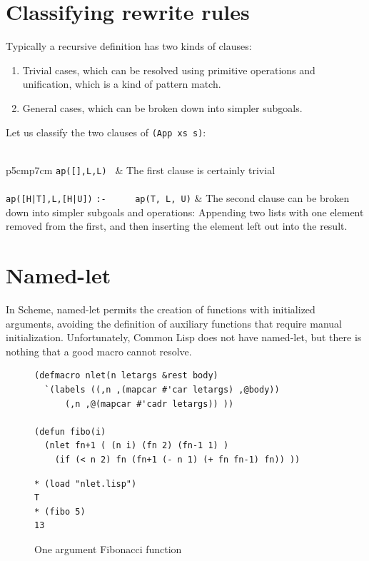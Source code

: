 \documentclass[a4paper,12pt]{book}
\newenvironment{fmpage}[1]
           {\begin{lrbox}{\fmbox}\begin{minipage}{#1}}
           {\end{minipage}\end{lrbox}\fbox{\usebox{\fmbox}}}
\begin{document}
\section{Classifying rewrite rules}
Typically a recursive definition has two kinds of clauses:
\begin{enumerate}
\item Trivial cases, which can be  
resolved using primitive operations and unification, which is
a kind of pattern match.
\item General cases, which can be  
broken down into simpler subgoals.
\end{enumerate}
Let us classify the two clauses of \verb|(App xs s)|:\\

\verb||\\
\begin{tabular}{p{5cm}p{7cm}}
\verb|ap([],L,L) | & The first clause is certainly trivial\\
\\
\verb/ap([H|T],L,[H|U])/ \verb/:- /
\verb/    ap(T, L, U)/
& The second clause can be
broken down into simpler
subgoals and operations: Appending two
lists with one element
removed from the first,
and then inserting the element
left out into the result.\\
\end{tabular}


\section{Named-let}

In Scheme, named-let
permits the creation of functions with initialized arguments,
avoiding the definition of auxiliary functions that require
manual initialization. Unfortunately, Common Lisp does not
have named-let, but there is nothing that a good macro
cannot resolve.

\begin{figure}[!h]
\begin{fmpage}{0.9\linewidth}
\begin{verbatim}
(defmacro nlet(n letargs &rest body)
  `(labels ((,n ,(mapcar #'car letargs) ,@body))
      (,n ,@(mapcar #'cadr letargs)) ))

(defun fibo(i)
  (nlet fn+1 ( (n i) (fn 2) (fn-1 1) )
    (if (< n 2) fn (fn+1 (- n 1) (+ fn fn-1) fn)) ))
\end{verbatim}
\end{fmpage}

\begin{fmpage}{0.9\linewidth}
\begin{verbatim}
* (load "nlet.lisp")
T
* (fibo 5)
13
\end{verbatim}
\end{fmpage}
\caption{One argument Fibonacci function}
\label{oneargfib}
\end{figure}
\end{document}
